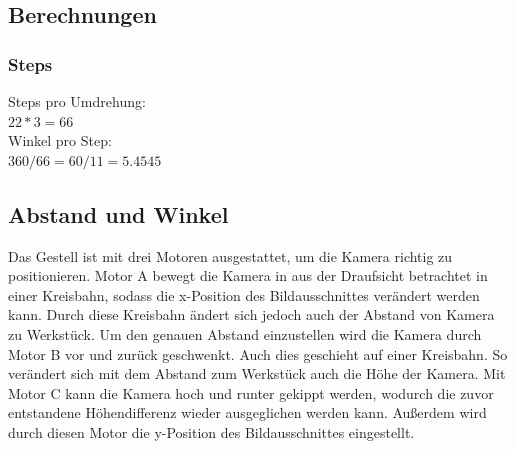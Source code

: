\documentclass[12pt,a4paper,bibliography=totocnumbered,listof=totocnumbered]{scrartcl}
\begin{document}
\subsection{Berechnungen}
\subsubsection{Steps}
\label{berechnungSteps}
Steps pro Umdrehung: \\
$22*3 = 66 $\\
Winkel pro Step: \\
$360/66 = 60/11 = 5.4545$\\
\subsection{Abstand und Winkel}
Das Gestell ist mit drei Motoren ausgestattet, um die Kamera richtig zu positionieren. Motor A bewegt die Kamera in aus der Draufsicht betrachtet in einer Kreisbahn, sodass die x-Position des Bildausschnittes verändert werden kann. Durch diese Kreisbahn ändert sich jedoch auch der Abstand von Kamera zu Werkstück. Um den genauen Abstand einzustellen wird die Kamera durch Motor B vor und zurück geschwenkt. Auch dies geschieht auf einer Kreisbahn. So verändert sich mit dem Abstand zum Werkstück auch die Höhe der Kamera. Mit Motor C kann die Kamera hoch und runter gekippt werden, wodurch die zuvor entstandene Höhendifferenz wieder ausgeglichen werden kann. Außerdem wird durch diesen Motor die y-Position des Bildausschnittes eingestellt.
\end{document}
